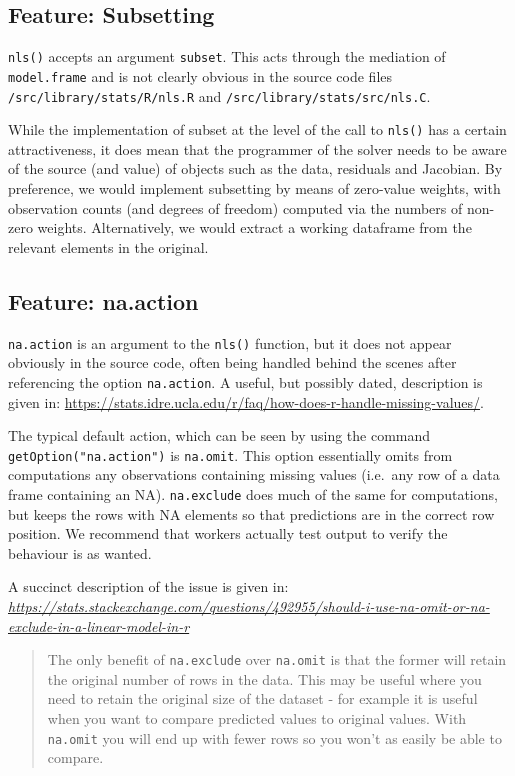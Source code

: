 \documentclass[
]{article}
\begin{document}
\hypertarget{feature-subsetting}{%
\subsection{Feature: Subsetting}\label{feature-subsetting}}

\texttt{nls()} accepts an argument \texttt{subset}. This acts through
the mediation of \texttt{model.frame} and is not clearly obvious in the
source code files \texttt{/src/library/stats/R/nls.R} and
\texttt{/src/library/stats/src/nls.C}.

While the implementation of subset at the level of the call to
\texttt{nls()} has a certain attractiveness, it does mean that the
programmer of the solver needs to be aware of the source (and value) of
objects such as the data, residuals and Jacobian. By preference, we
would implement subsetting by means of zero-value weights, with
observation counts (and degrees of freedom) computed via the numbers of
non-zero weights. Alternatively, we would extract a working dataframe
from the relevant elements in the original.

\hypertarget{feature-na.action}{%
\subsection{Feature: na.action}\label{feature-na.action}}

\texttt{na.action} is an argument to the \texttt{nls()} function, but it
does not appear obviously in the source code, often being handled behind
the scenes after referencing the option \texttt{na.action}. A useful,
but possibly dated, description is given in:
\url{https://stats.idre.ucla.edu/r/faq/how-does-r-handle-missing-values/}.

The typical default action, which can be seen by using the command
\texttt{getOption("na.action")} is \texttt{na.omit}. This option
essentially omits from computations any observations containing missing
values (i.e.~any row of a data frame containing an NA).
\texttt{na.exclude} does much of the same for computations, but keeps
the rows with NA elements so that predictions are in the correct row
position. We recommend that workers actually test output to verify the
behaviour is as wanted.

A succinct description of the issue is given in:
\emph{\url{https://stats.stackexchange.com/questions/492955/should-i-use-na-omit-or-na-exclude-in-a-linear-model-in-r}}

\begin{quote}
The only benefit of \texttt{na.exclude} over \texttt{na.omit} is that
the former will retain the original number of rows in the data. This may
be useful where you need to retain the original size of the dataset -
for example it is useful when you want to compare predicted values to
original values. With \texttt{na.omit} you will end up with fewer rows
so you won't as easily be able to compare.
\end{quote}
\end{document}

